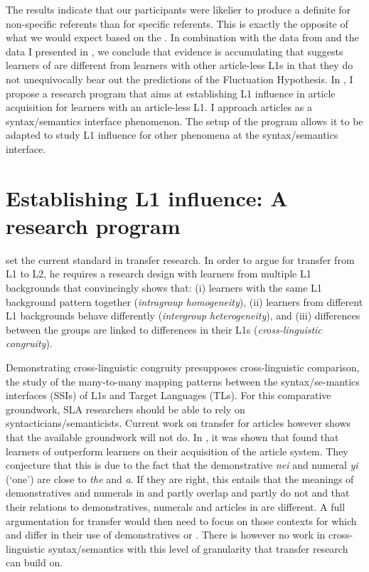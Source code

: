\documentclass[output=paper,
modfonts
]{langscibook}
\begin{document}
The results indicate that our participants were likelier to produce a definite for non-specific referents than for specific referents. This is exactly the opposite of what we would expect based on the . In combination with the data from \citet{Ting2005} and the data I presented in , we conclude that evidence is accumulating that suggests  learners of  are different from learners with other article-less L1s in that they do not unequivocally bear out the predictions of the Fluctuation Hypothesis. In , I propose a research program that aims at establishing L1 influence in article acquisition for learners with an article-less L1. I approach articles as a syntax/semantics interface phenomenon. The setup of the program allows it to be adapted to study L1 influence for other phenomena at the syntax/semantics interface. 

\section{Establishing L1 influence: A research program}
\label{sec:lebruyn:5}

\citet{Jarvis2000} set the current standard in transfer research. In order to argue for transfer from L1 to L2, he requires a research design with learners from multiple L1 backgrounds that convincingly shows that: (i) learners with the same L1 background pattern together (\textit{intragroup homogeneity}), (ii) learners from different L1 backgrounds behave differently (\textit{intergroup heterogeneity}), and (iii) differences between the groups are linked to differences in their L1s (\textit{cross-linguistic congruity}).

Demonstrating cross-linguistic congruity presupposes cross-linguistic comparison, the study of the many-to-many mapping patterns between the syntax/se\hyp{}mantics interfaces (SSIs) of L1s and Target Languages (TLs). For this comparative groundwork, SLA researchers should be able to rely on syntacticians/semanticists. Current work on transfer for articles however shows that the available groundwork will not do. In , it was shown that \citet{SnapeLeungTing2006} found that  learners of  outperform  learners on their acquisition of the  article system. They conjecture that this is due to the fact that the  demonstrative \textit{nei} and numeral \textit{yi} (‘one’) are close to  \textit{the} and \textit{a}. If they are right, this entails that the meanings of demonstratives and numerals in  and  partly overlap and partly do not and that their relations to demonstratives, numerals and articles in  are different. A full argumentation for transfer would then need to focus on those contexts for which  and  differ in their use of demonstratives or . There is however no work in cross-linguistic syntax/semantics with this level of granularity that transfer research can build on.
\end{document}
